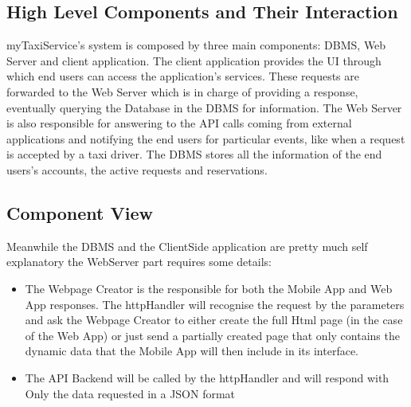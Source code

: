 \documentclass{article}
\begin{document}
\subsection{High Level Components and Their Interaction}
myTaxiService's system is composed by three main components: DBMS, Web Server and client application. The client application provides the UI through which end users can access the application's services. These requests are forwarded to the Web Server which is in charge of providing a response, eventually querying the Database in the DBMS for information. The Web Server is also responsible for answering to the API calls coming from external applications and notifying the end users for particular events, like when a request is accepted by a taxi driver. The DBMS stores all the information of the end users's accounts, the active requests and reservations. %
\subsection{Component View}
\begin{figure}[H]
\end{figure}
	  Meanwhile the DBMS and the ClientSide application are pretty much self explanatory the WebServer part requires some details:
	  \begin{itemize}
			  \item The Webpage Creator is the responsible for both the Mobile App and Web App responses. The httpHandler will recognise the request by the parameters and ask the Webpage Creator to either create the full Html page (in the case of the Web App) or just send a partially created page that only contains the dynamic data that the Mobile App will then include in its interface.
			  \item The API Backend will be called by the httpHandler and will respond with Only the data requested in a JSON format
	  \end{itemize}
\end{document}
